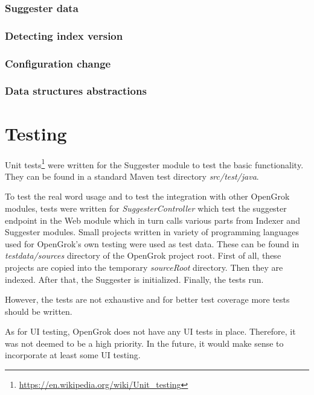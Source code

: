 \subsubsection{Suggester data}

\subsubsection{Detecting index version}

\subsubsection{Configuration change}

\subsubsection{Data structures abstractions}

\section{Testing}
Unit tests\footnote{\url{https://en.wikipedia.org/wiki/Unit_testing}} were written for the Suggester module to test
the basic functionality. They can be found in a standard Maven test directory \textit{src/test/java}.

To test the real word usage and to test the integration with other OpenGrok modules,
tests were written for \textit{SuggesterController} which test the
suggester endpoint in the Web module which in turn calls various parts from Indexer and Suggester modules.
Small projects written in variety of programming languages used for OpenGrok's own testing were used as test data.
These can be found in \textit{testdata/sources} directory of the OpenGrok project root.
First of all, these projects are copied into the temporary \textit{sourceRoot} directory. Then they are indexed.
After that, the Suggester is initialized. Finally, the tests run.

However, the tests are not exhaustive and for better test coverage more tests should be written.

As for UI testing, OpenGrok does not have any UI tests in place. Therefore, it was not deemed to be a high priority.
In the future, it would make sense to incorporate at least some UI testing.